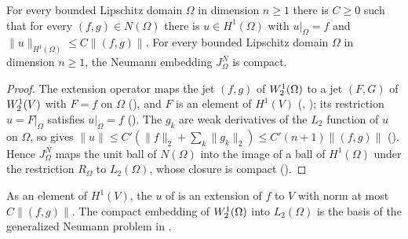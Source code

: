 \begin{theorem}
\label{thm:neumann-rellich}
\leanok
{}
For every bounded Lipschitz domain $\Omega$ in dimension $n \geq 1$ there is $C \geq 0$ such that
for every $(f, g) \in N(\Omega)$ there is $u \in H^1(\Omega)$ with $u|_\Omega = f$ and
$\|u\|_{H^1(\Omega)} \leq C \|(f, g)\|$. For every bounded Lipschitz domain $\Omega$ in dimension
$n \geq 1$, the Neumann embedding $J^N_\Omega$ is compact.
\end{theorem}

\begin{proof}
\leanok
The extension operator maps the jet $(f, g)$ of $W^{1}_{2}(\Omega)$ to a jet $(F, G)$ of
$W^{1}_{2}(V)$ with $F = f$ on $\Omega$ (), and $F$ is
an element of $H^1(V)$
(, ); its restriction $u = F|_\Omega$
satisfies $u|_\Omega = f$ (). The $g_k$ are weak derivatives
of the $L_2$ function of $u$ on $\Omega$, so  gives
$\|u\| \leq C' (\|f\|_2 + \sum_k \|g_k\|_2) \leq C' (n + 1) \|(f, g)\|$
(). Hence $J^N_\Omega$ maps the unit ball of $N(\Omega)$ into the image
of a ball of $H^1(\Omega)$ under the restriction $R_\Omega$ to $L_2(\Omega)$, whose closure is
compact ().
\end{proof}

As an element of $H^1(V)$, the $u$ of  is an extension of $f$ to $V$
with norm at most $C \|(f, g)\|$. The compact embedding of $W^{1}_{2}(\Omega)$ into
$L_2(\Omega)$ is the basis of the generalized Neumann problem in
\cite[Chapter~6]{EdmundsEvans2018}.

